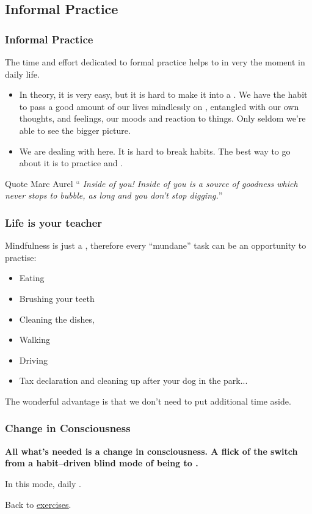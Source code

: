 \subsection{Informal Practice}
\begin{frame}
\frametitle{Informal Practice}
The time and effort dedicated to formal practice helps to  in very the moment in daily life. 

\begin{itemize}
\item  In theory, it is very easy, but it is hard to make it into a . We have the habit to pass a good amount of our lives mindlessly on , entangled with our own thoughts, and feelings, our moods and reaction to things. Only seldom we're able to see the bigger picture.
\item We are dealing with  here. It is hard to break habits. The best way to go about it is to practice and .
\end{itemize}
\begin{block}{Quote Marc Aurel}
``\textit{ Inside of you! Inside of you is a source of goodness which never stops to bubble, as long and you don't stop digging.}''
\end{block}
\end{frame}

\begin{frame}
\frametitle{Life is your teacher}
Mindfulness is just a , therefore every ``mundane'' task can be an opportunity to practise:
\begin{itemize}
\item  Eating
\item Brushing your teeth
\item Cleaning the dishes,
\item Walking
\item Driving
\item Tax declaration and cleaning up after your dog in the park...
\end{itemize}
The wonderful advantage is that we don't need to put additional time aside.
\end{frame}

\begin{frame}
\frametitle{Change in Consciousness}

\textbf{All what's needed is a change in consciousness. A flick of the switch from a habit--driven blind  mode of being to .}

In this mode, daily .


\vspace{3.5cm}
Back to \href{run:./Exercises.pdf}{\underline{exercises}}.

\end{frame}



